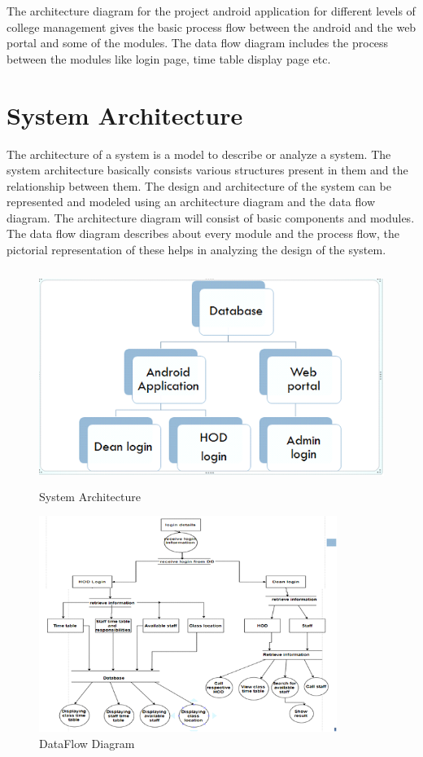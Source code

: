 \documentclass[BTech]{srmuthesis}
\begin{document}
The architecture diagram for the project android application for different levels of college management gives the basic process flow between the android and the web portal and some of the modules. The data flow diagram includes the process between the modules like login page, time table display page etc.
\section{System Architecture}
The architecture of a system is a model to describe or analyze a system. The system architecture basically consists various structures present in them and the relationship between them. The design and architecture of the system can be represented and modeled using an architecture diagram and the data flow diagram. The architecture diagram will consist of  basic components and modules. The data flow diagram describes about every module and the process flow, the pictorial representation of these helps in analyzing the design of the system.
\begin{figure}[htbp]
	\centering
	\includegraphics[width=\linewidth, height=7cm,keepaspectratio]{arch}
	\caption{System Architecture}
	\label{fig:arch}
\end{figure}
\begin{figure}[htbp]
	\centering
	\includegraphics[width=\linewidth, height=7cm,keepaspectratio]{dataflow}
	\caption{DataFlow Diagram}
	\label{fig:data}
\end{figure}
\end{document}
